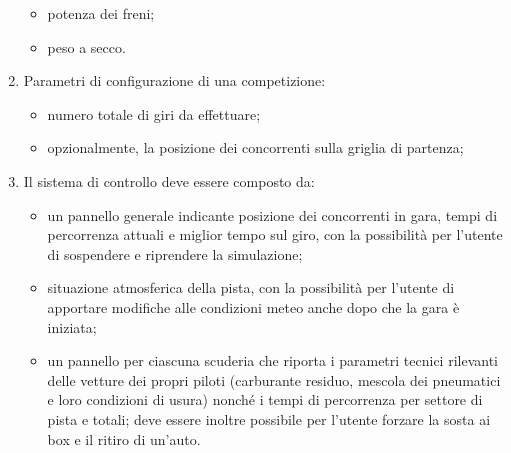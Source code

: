 \begin{enumerate}
\begin{itemize}
        \item potenza dei freni;
        \item peso a secco.
        \end{itemize}
\item Parametri di configurazione di una competizione:
        \begin{itemize}
        \item numero totale di giri da effettuare;
        \item opzionalmente, la posizione dei concorrenti sulla griglia di partenza;
        \end{itemize}
\item Il sistema di controllo deve essere composto da:
        \begin{itemize}
        \item un pannello generale indicante posizione dei concorrenti in gara, tempi di percorrenza attuali e miglior tempo sul giro, con la possibilità per l'utente di sospendere e riprendere la simulazione;
        \item situazione atmosferica della pista, con la possibilità per l'utente di apportare modifiche alle condizioni meteo anche dopo che la gara è iniziata;
        \item un pannello per ciascuna scuderia che riporta i parametri tecnici rilevanti delle vetture dei propri piloti (carburante residuo, mescola dei pneumatici e loro condizioni di usura) nonché i tempi di percorrenza per settore di pista e totali; deve essere inoltre possibile per l'utente forzare la sosta ai box e il ritiro di un'auto.
        \end{itemize}
\end{enumerate}
 
